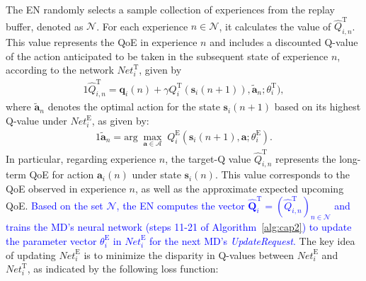 \documentclass[10pt, journal,letterpaper]{IEEEtran}
\begin{document}
The EN randomly selects a sample collection of experiences from the replay buffer, denoted as $\mathcal{N}$. For each experience $n \in \mathcal{N}$, it calculates the value of $	\hat{Q}^{\text{T}}_{i,n}$. This value represents the QoE in experience $n$ and includes a discounted Q-value of the action anticipated to be taken in the subsequent state of experience $n$, according to the network $\textit{Net}^\text{T}_i$, given by
\begin{alignat}{1}
	\hat{Q}_{i,n}^{\text{T}} = \boldsymbol{q}_i(n) + \gamma Q_i^{\text{T}}(\boldsymbol{s}_i(n+1)), \tilde{\boldsymbol{a}}_n; \theta_i^{\text{T}}),
	\label{29}  
\end{alignat}  
where $\tilde{\boldsymbol{a}}_n$ denotes the optimal action for the state $\boldsymbol{s}_i(n+1)$ based on its highest Q-value under $\textit{Net}_i^{\text{E}}$, as given by:
\begin{alignat}{1}
	\tilde{\boldsymbol{a}}_n = \text{arg} \; \max_{\boldsymbol{a} \in \mathcal{A}} \; Q_i^{\text{E}}(\boldsymbol{s}_i(n+1), \boldsymbol{a}; \theta_i^{\text{E}}).
	\label{30}  
\end{alignat} 
In particular, regarding experience $n$, the target-Q value $\hat{Q}_{i,n}^{\text{T}}$ represents the long-term QoE for action $\boldsymbol{a}_i(n)$ under state $\boldsymbol{s}_i(n)$. This value corresponds to the QoE observed in experience $n$, as well as the approximate expected upcoming QoE. %
\textcolor{blue}{Based on the set $\mathcal{N}$, the EN computes the vector $\hat{\mathbf{Q}}_i^{\text{T}} = (\hat{Q}^{\text{T}}_{i,n})_{n \in \mathcal{N}}$ and trains the MD's neural network (steps 11-21 of Algorithm~\ref{alg:cap2}) to update the parameter vector $\theta^{\text{E}}_i$ in $\textit{Net}_i^{\text{E}}$ for the next MD's \textit{UpdateRequest}.} The key idea of updating $\textit{Net}_i^{\text{E}}$ is to minimize the disparity in Q-values between $\textit{Net}_i^{\text{E}}$ and $\textit{Net}_i^{\text{T}}$, as indicated by the following loss function:
\end{document}
